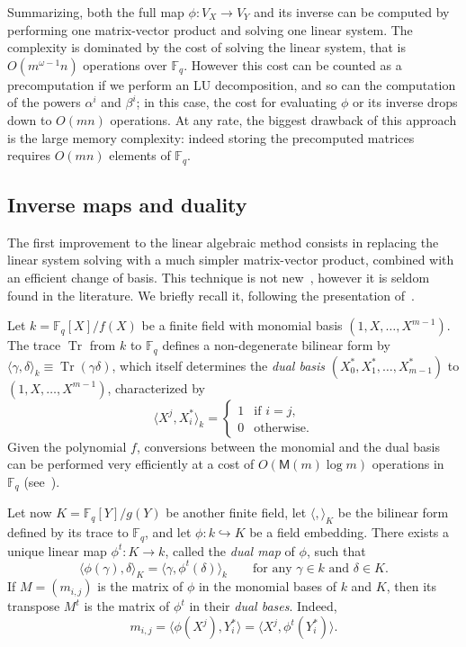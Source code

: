 \documentclass[12pt]{article}
\theoremstyle{plain}
\theoremstyle{definition}
\newcommand{\ang}[1]{\langle#1\rangle}
\DeclareMathOperator{\trace}{Tr} %
\def\F{\ensuremath{\mathbb{F}}}
\def\MM{\ensuremath{\mathsf{M}}}
\begin{document}
Summarizing, both the full map $\phi:V_X\to V_Y$ and its inverse can
be computed by performing one matrix-vector product and solving one
linear system. %
The complexity is dominated by the cost of solving the linear system,
that is $O(m^{\omega-1}n)$ operations over $\F_q$. %
However this cost can be counted as a precomputation if we perform an
LU decomposition, and so can the computation of the powers $\alpha^i$
and $\beta^i$; in this case, the cost for evaluating $\phi$ or its
inverse drops down to $O(mn)$ operations. %
At any rate, the biggest drawback of this approach is the large memory
complexity: indeed storing the precomputed matrices requires $O(mn)$
elements of $\F_q$.

\subsection{Inverse maps and duality}

The first improvement to the linear algebraic method consists in
replacing the linear system solving with a much simpler matrix-vector
product, combined with an efficient change of basis. %
This technique is not
new~\cite{shoup94,shoup95,shoup99,bostan+salvy+schost03}, however it
is seldom found in the literature. %
We briefly recall it, following the presentation of~\cite{DeDoSc2014}.

Let $k=\F_q[X]/f(X)$ be a finite field with monomial basis
$(1,X,\dots,X^{m-1})$. %
The trace $\trace$ from $k$ to $\F_q$ defines a non-degenerate
bilinear form by
$\ang{\gamma,\delta}_k \equiv \trace(\gamma\delta)$,
which itself determines the \emph{dual basis}
$(X_0^*,X_1^*,\dots,X_{m-1}^*)$ to $(1,X,\dots,X^{m-1})$,
characterized by
\begin{equation*}
  \ang{X^j,X_i^*}_k = \begin{cases}
    1 &\text{if $i=j$,}\\
    0 &\text{otherwise.}
  \end{cases}
\end{equation*}
Given the polynomial $f$, conversions between the monomial and the
dual basis can be performed very efficiently at a cost of
$O(\MM(m)\log m)$ operations in $\F_q$ (see~\cite[\S~3]{DeDoSc2014}).

Let now $K=\F_q[Y]/g(Y)$ be another finite field, let $\ang{,}_K$ be
the bilinear form defined by its trace to $\F_q$, and let
$\phi:k\hookrightarrow K$ be a field embedding. %
There exists a unique linear map $\phi^t:K\to k$, called the
\emph{dual map} of $\phi$, such that
\begin{equation*}
  \ang{\phi(\gamma),\delta}_K=\ang{\gamma,\phi^t(\delta)}_k
  \qquad\text{for any $\gamma\in k$ and $\delta\in K$.}
\end{equation*}
If $M=(m_{i,j})$ is the matrix of $\phi$ in the monomial bases of $k$
and $K$, then its transpose $M^t$ is the matrix of $\phi^t$ in their
\emph{dual bases}. %
Indeed,
\begin{equation}
  \label{eq:tellegen-matrix}
  m_{i,j} = \ang{\phi(X^j),Y_i^*} = \ang{X^j,\phi^t(Y_i^*)}.
\end{equation}
\end{document}
